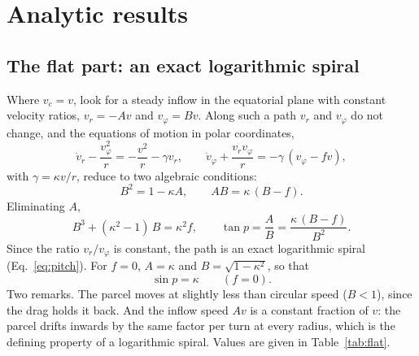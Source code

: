 \documentclass[11pt,a4paper]{article}
\begin{document}
\section{Analytic results}

\subsection{The flat part: an exact logarithmic spiral}\label{sec:flat}
Where $v_c=v$, look for a steady inflow in the equatorial plane with constant
velocity ratios, $v_r=-Av$ and $v_\varphi=Bv$. Along such a path $v_r$ and
$v_\varphi$ do not change, and the equations of motion in polar coordinates,
\begin{equation}
  \dot v_r-\frac{v_\varphi^2}{r}=-\frac{v^2}{r}-\gamma v_r,
  \qquad
  \dot v_\varphi+\frac{v_rv_\varphi}{r}=-\gamma\,(v_\varphi-fv),
\end{equation}
with $\gamma=\kappa v/r$, reduce to two algebraic conditions:
\begin{equation}
  B^2=1-\kappa A,\qquad AB=\kappa\,(B-f).
\end{equation}
Eliminating $A$,
\begin{equation}
  B^3+(\kappa^2-1)\,B=\kappa^2f,\qquad
  \tan p=\frac AB=\frac{\kappa\,(B-f)}{B^2}.
  \label{eq:flat}
\end{equation}
Since the ratio $v_r/v_\varphi$ is constant, the path is an exact logarithmic spiral
(Eq.~\ref{eq:pitch}). For $f=0$, $A=\kappa$ and $B=\sqrt{1-\kappa^2}$, so that
\begin{equation}
  \sin p=\kappa\qquad(f=0).
\end{equation}
Two remarks. The parcel moves at slightly less than circular speed ($B<1$), since
the drag holds it back. And the inflow speed $Av$ is a constant fraction of $v$: the
parcel drifts inwards by the same factor per turn at every radius, which is the
defining property of a logarithmic spiral. Values are given in Table~\ref{tab:flat}.
\end{document}
